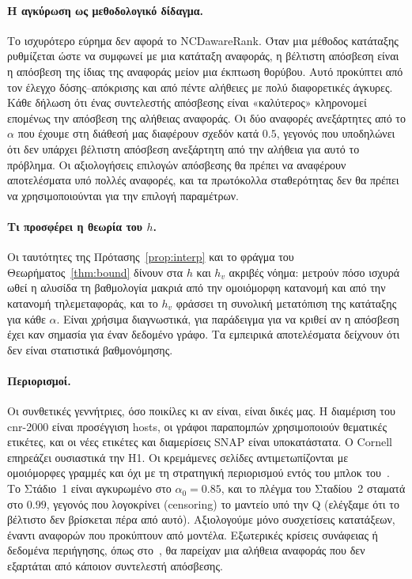 \documentclass[11pt,a4paper]{article}
\theoremstyle{definition}
\theoremstyle{remark}
\begin{document}
\paragraph{Η αγκύρωση ως μεθοδολογικό δίδαγμα.} Το ισχυρότερο εύρημα δεν αφορά το NCDawareRank. Όταν
μια μέθοδος κατάταξης ρυθμίζεται ώστε να συμφωνεί με μια κατάταξη αναφοράς, η βέλτιστη απόσβεση είναι η
απόσβεση της ίδιας της αναφοράς μείον μια έκπτωση θορύβου. Αυτό προκύπτει από τον έλεγχο
δόσης--απόκρισης και από πέντε αλήθειες με πολύ διαφορετικές άγκυρες. Κάθε δήλωση ότι ένας συντελεστής
απόσβεσης είναι «καλύτερος» κληρονομεί επομένως την απόσβεση της αλήθειας αναφοράς. Οι δύο αναφορές
ανεξάρτητες από το $\alpha$ που έχουμε στη διάθεσή μας διαφέρουν σχεδόν κατά $0.5$, γεγονός που
υποδηλώνει ότι δεν υπάρχει βέλτιστη απόσβεση ανεξάρτητη από την αλήθεια για αυτό το πρόβλημα. Οι
αξιολογήσεις επιλογών απόσβεσης θα πρέπει να αναφέρουν αποτελέσματα υπό πολλές αναφορές, και τα
πρωτόκολλα σταθερότητας δεν θα πρέπει να χρησιμοποιούνται για την επιλογή παραμέτρων.

\paragraph{Τι προσφέρει η θεωρία του $h$.} Οι ταυτότητες της Πρότασης~\ref{prop:interp} και το φράγμα
του Θεωρήματος~\ref{thm:bound} δίνουν στα $h$ και $h_v$ ακριβές νόημα: μετρούν πόσο ισχυρά ωθεί η
αλυσίδα τη βαθμολογία μακριά από την ομοιόμορφη κατανομή και από την κατανομή τηλεμεταφοράς, και το
$h_v$ φράσσει τη συνολική μετατόπιση της κατάταξης για κάθε $\alpha$. Είναι χρήσιμα διαγνωστικά, για
παράδειγμα για να κριθεί αν η απόσβεση έχει καν σημασία για έναν δεδομένο γράφο. Τα εμπειρικά
αποτελέσματα δείχνουν ότι δεν είναι στατιστικά βαθμονόμησης.

\paragraph{Περιορισμοί.} Οι συνθετικές γεννήτριες, όσο ποικίλες κι αν είναι, είναι δικές μας. Η
διαμέριση του cnr-2000 είναι προσέγγιση hosts, οι γράφοι παραπομπών χρησιμοποιούν θεματικές
ετικέτες, και οι νέες ετικέτες και διαμερίσεις SNAP είναι υποκατάστατα. Ο Cornell επηρεάζει ουσιαστικά
την H1. Οι κρεμάμενες σελίδες αντιμετωπίζονται με ομοιόμορφες γραμμές και όχι με τη
στρατηγική περιορισμού εντός του μπλοκ του~\cite{ng20}. Το Στάδιο~1 είναι αγκυρωμένο στο $\alpha_0=0.85$,
και το πλέγμα του Σταδίου~2 σταματά στο $0.99$, γεγονός που λογοκρίνει (censoring) το μαντείο υπό την Q
(ελέγξαμε ότι το βέλτιστο δεν βρίσκεται πέρα από αυτό). Αξιολογούμε μόνο συσχετίσεις κατατάξεων, έναντι
αναφορών που προκύπτουν από μοντέλα. Εξωτερικές κρίσεις συνάφειας ή δεδομένα περιήγησης, όπως
στο~\cite{gleich10}, θα παρείχαν μια αλήθεια αναφοράς που δεν εξαρτάται από κάποιον συντελεστή
απόσβεσης.
\end{document}

